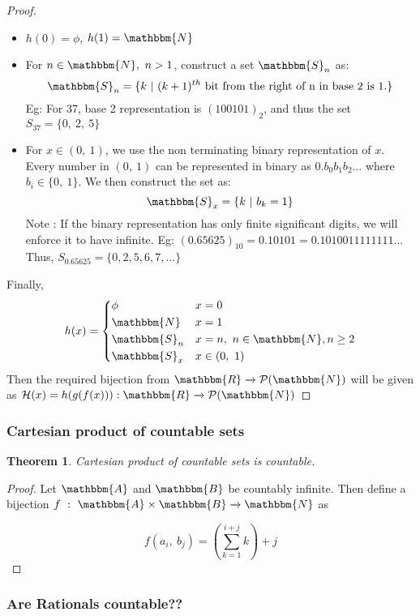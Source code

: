 \documentclass[14pt]{extarticle}
\newcommand{\impl}{\xrightarrow{}}
\newcommand{\N}{\mathbbm{N}}
\newcommand{\R}{\mathbbm{R}}
\newcommand{\A}{\mathbbm{A}}
\newcommand{\B}{\mathbbm{B}}
\newcommand{\Sset}{\mathbbm{S}}
\newcommand{\powerset}{\mathcal{P}}
\newtheorem{theorem}{Theorem}
\begin{document}
\begin{proof}
    \begin{itemize}
        \item $h(0) = \phi$, $h(1) = \N$
        \item For $n \in \N, \ n>1$, construct a set $\Sset_n$ as:
        \[
            \Sset_n = \{k \ | \ (k+1)^{th} \text{ bit from the right of n in base 2 is 1.}\}
        \]
        Eg: For 37, base 2 representation is $(100101)_2$, and thus the set $S_{37} = \{0, \ 2, \ 5\}$
        \item For $x \in (0, \ 1)$, we use the non terminating binary representation of $x$. Every number in $(0, \ 1)$ can be represented in binary as $0.b_0b_1b_2\dots$ where $b_i \in \{0,\ 1\}$.
        We then construct the set as:
        \[
            \Sset_x = \{k \ | \ b_k = 1\}
        \]
        Note : If the binary representation has only finite significant digits, we will enforce it to have infinite. Eg: $(0.65625)_{10} = 0.10101 = 0.1010011111111\dots$
        Thus, $S_{0.65625} = \{0, 2, 5, 6, 7, \dots\}$
    \end{itemize}

    Finally,
    \[
        h(x) = \begin{dcases}
            \phi & x = 0 \\
            \N & x = 1 \\
            \Sset_n & x = n, \ n \in \N, n \geq 2 \\
            \Sset_x & x \in (0, \ 1)
        \end{dcases}
    \]
    Then the required bijection from $\R \impl \powerset{(\N)}$ will be given as $\mathcal{H}(x) = h(g(f(x))) : \R \impl \powerset(\N)$
\end{proof}

\subsubsection{Cartesian product of countable sets}

\begin{theorem}
    Cartesian product of countable sets is countable.
\end{theorem}

\begin{proof}
    Let $\A$ and $\B$ be countably infinite. Then define a bijection $f \ : \ \A \times \B \impl \N$ as

    \[
        f(a_i, \ b_j) = (\sum_{k = 1}^{i+j} k) + j
    \]
\end{proof}

\subsubsection{Are Rationals countable??}
\end{document}
